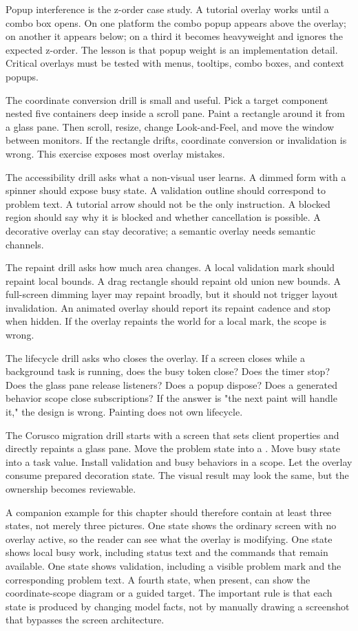 Popup interference is the z-order case study. A tutorial overlay works until a combo box opens. On one platform the combo popup appears above the overlay; on another it appears below; on a third it becomes heavyweight and ignores the expected z-order. The lesson is that popup weight is an implementation detail. Critical overlays must be tested with menus, tooltips, combo boxes, and context popups.

The coordinate conversion drill is small and useful. Pick a target component nested five containers deep inside a scroll pane. Paint a rectangle around it from a glass pane. Then scroll, resize, change Look-and-Feel, and move the window between monitors. If the rectangle drifts, coordinate conversion or invalidation is wrong. This exercise exposes most overlay mistakes.

The accessibility drill asks what a non-visual user learns. A dimmed form with a spinner should expose busy state. A validation outline should correspond to problem text. A tutorial arrow should not be the only instruction. A blocked region should say why it is blocked and whether cancellation is possible. A decorative overlay can stay decorative; a semantic overlay needs semantic channels.

The repaint drill asks how much area changes. A local validation mark should repaint local bounds. A drag rectangle should repaint old union new bounds. A full-screen dimming layer may repaint broadly, but it should not trigger layout invalidation. An animated overlay should report its repaint cadence and stop when hidden. If the overlay repaints the world for a local mark, the scope is wrong.

The lifecycle drill asks who closes the overlay. If a screen closes while a background task is running, does the busy token close? Does the timer stop? Does the glass pane release listeners? Does a popup dispose? Does a generated behavior scope close subscriptions? If the answer is "the next paint will handle it," the design is wrong. Painting does not own lifecycle.

The Corusco migration drill starts with a screen that sets client properties and directly repaints a glass pane. Move the problem state into a . Move busy state into a task value. Install validation and busy behaviors in a scope. Let the overlay consume prepared decoration state. The visual result may look the same, but the ownership becomes reviewable.

A companion example for this chapter should therefore contain at least three
states, not merely three pictures. One state shows the ordinary screen with no
overlay active, so the reader can see what the overlay is modifying. One state
shows local busy work, including status text and the commands that remain
available. One state shows validation, including a visible problem mark and
the corresponding problem text. A fourth state, when present, can show the
coordinate-scope diagram or a guided target. The important rule is that each
state is produced by changing model facts, not by manually drawing a screenshot
that bypasses the screen architecture.

